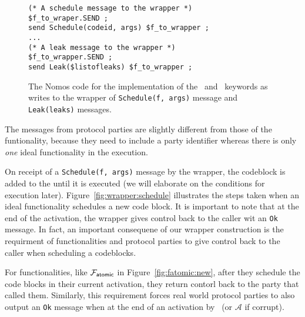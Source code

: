 \begin{figure}
\begin{lstlisting}[basicstyle=\small\ttfamily, frame=single]
(* A schedule message to the wrapper *)
$f_to_wraper.SEND ;
send Schedule(codeid, args) $f_to_wrapper ;
...
(* A leak message to the wrapper *)
$f_to_wrapper.SEND ;
send Leak($listofleaks) $f_to_wrapper ;
\end{lstlisting}
\caption{The Nomos code for the implementation of the \Eventually~and \Leak~keywords as writes to the wrapper of \texttt{Schedule(f, args)} message and \texttt{Leak(leaks)} messages.}
\label{fig:nomosscheduleleak}
\end{figure}

The  messages from protocol parties are slightly different from those of the funtionality, because they need to include a party identifier whereas there is only \textit{one} ideal functionality in the execution.

On receipt of a \texttt{Schedule(f, args)} message by the wrapper, the codeblock is added to the  until it is executed (we will elaborate on the conditions for execution later). 
Figure~\ref{fig:wrapper:schedule} illustrates the steps taken when an ideal functionality schedules a new code block.
It is important to note that at the end of the activation, the wrapper gives control back to the caller wit an \texttt{Ok} message.
In fact, an important consequene of our wrapper construction is the requirment of functionalities and protocol parties to give control back to the caller when scheduling a codeblocks.

For functionalities, like $\mathcal{F}_{{\mathsf {atomic}}}$ in Figure~\ref{fig:fatomic:new}, after they schedule the code blocks in their current activation, they return contorl back to the party that called them.
Similarly, this requirement forces real world protocol parties to also output an \texttt{Ok} message when at the end of an activation by \Environment~(or $\mathcal{A}$ if corrupt).

